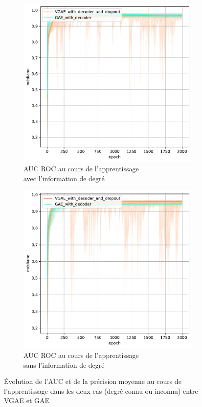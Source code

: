 \documentclass{article}
\begin{document}
\begin{figure}[H]
    \begin{subfigure}{0.45\textwidth}
      \includegraphics[width=\textwidth]{graphics/AUCs_degree_vgae_cinf.svg.pdf}
      \centering
      \caption{AUC ROC au cours de l'apprentissage\\ avec l'information de degré}
    \end{subfigure}
    \begin{subfigure}{0.45\textwidth}
      \includegraphics[width=\textwidth]{graphics/AUCs_no_degree_vgae_cinf.svg.pdf}
      \centering
      \caption{AUC ROC au cours de l'apprentissage\\ sans l'information de degré}
    \end{subfigure}
    \caption{Évolution de l'AUC et de la précision moyenne au cours de l'apprentissage dans les deux cas (degré connu ou inconnu) entre VGAE et GAE}
    \label{fig:vgae}
\end{figure}
\end{document}
